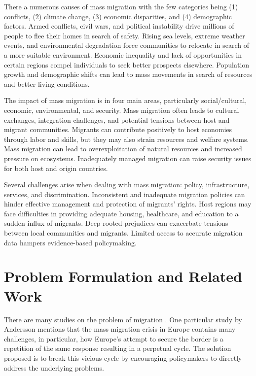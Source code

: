 \documentclass[conference]{IEEEtran}
\begin{document}
	There a numerous causes of mass migration with the few categories being (1) conflicts, (2) climate change, (3) economic disparities, and (4) demographic factors. Armed conflicts, civil wars, and political instability drive millions of people to flee their homes in search of safety. Rising sea levels, extreme weather events, and environmental degradation force communities to relocate in search of a more suitable environment. Economic inequality and lack of opportunities in certain regions compel individuals to seek better prospects elsewhere. Population growth and demographic shifts can lead to mass movements in search of resources and better living conditions.
	
	The impact of mass migration is in four main areas, particularly social/cultural, economic, environmental, and security.  Mass migration often leads to cultural exchanges, integration challenges, and potential tensions between host and migrant communities. Migrants can contribute positively to host economies through labor and skills, but they may also strain resources and welfare systems. Mass migration can lead to overexploitation of natural resources and increased pressure on ecosystems. Inadequately managed migration can raise security issues for both host and origin countries.
	
	Several challenges arise when dealing with mass migration: policy, infrastructure, services, and discrimination. Inconsistent and inadequate migration policies can hinder effective management and protection of migrants' rights.  Host regions may face difficulties in providing adequate housing, healthcare, and education to a sudden influx of migrants.  Deep-rooted prejudices can exacerbate tensions between local communities and migrants. Limited access to accurate migration data hampers evidence-based policymaking.
	
	\section{Problem Formulation and Related Work}
	There are many studies on the problem of migration \cite{andersson2016europe, lu2017systemic, estevens2018migration, lillywhite2022emergency}. One particular study by Andersson \cite{andersson2016europe} mentions that the mass migration crisis in Europe contains many challenges, in particular, how Europe's attempt to secure the border is a repetition of the same response resulting in a perpetual cycle.  The solution proposed is to break this vicious cycle by encouraging policymakers to directly address the underlying problems.
	
\end{document}
